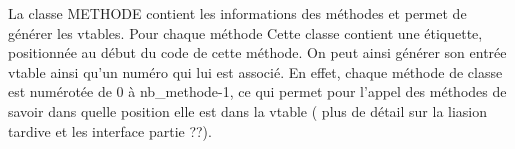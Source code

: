 La classe METHODE contient les informations des méthodes et permet de générer
les vtables. Pour chaque méthode Cette classe contient une étiquette,
positionnée au début du code de cette méthode. On peut ainsi générer son entrée
vtable ainsi qu'un numéro qui lui est associé. En effet, chaque méthode de
classe est numérotée de 0 à nb\_methode-1, ce qui permet pour l'appel des
méthodes de savoir dans quelle position elle est dans la vtable ( plus de détail
sur la liasion tardive et les interface partie ??).


